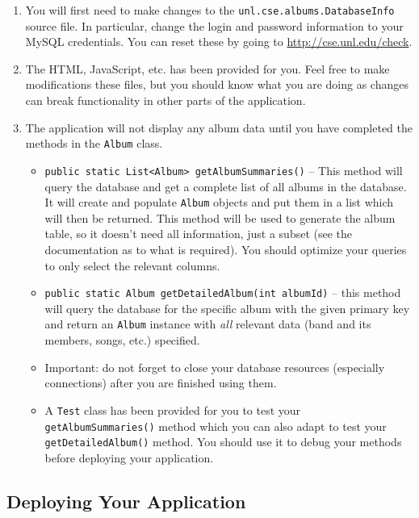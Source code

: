 \documentclass[12pt]{scrartcl}
\begin{document}
\begin{enumerate}
  \item You will first need to make changes to the 
  	\texttt{unl.cse.albums.DatabaseInfo} source file.  In 
	particular, change the login and password information to your
	MySQL credentials.  You can reset these by going to \url{http://cse.unl.edu/check}.
  \item The HTML, JavaScript, etc. has been provided for you.  Feel
    free to make modifications these files, but you should know what
    you are doing as changes can break functionality in other parts
    of the application.
  \item The application will not display any album data until you have
	completed the methods in the \texttt{Album} class.
	\begin{itemize}
	  \item \texttt{public static List<Album> getAlbumSummaries()} -- 
	  This method will query the database and get a complete list of all 
	  albums in the database.  It will create and populate 
	  \texttt{Album} objects and put them in a list 
	  which will then be returned.  This method will be used to 
	  generate the album table, so it doesn't need all information, just
	  a subset (see the documentation as to what is required).  
	  You should optimize your queries to only select the relevant columns.

	  \item \texttt{public static Album getDetailedAlbum(int albumId)} --
	  this method will query the database for the specific album with 
	  the given primary key and return an \texttt{Album}
	  instance with \emph{all} relevant data (band and its members, 
	  songs, etc.) specified. 

	  \item Important: do not forget to close your database resources 
      (especially connections) after you are finished using them.  
 	  \item A \texttt{Test} class has been provided for you 
      to test your \texttt{getAlbumSummaries()} method
      which you can also adapt to test your 
      \texttt{getDetailedAlbum()} method.  You should use 
      it to debug your methods before deploying your application.
    \end{itemize}
\end{enumerate}
    
\subsection*{Deploying Your Application}
\end{document}
